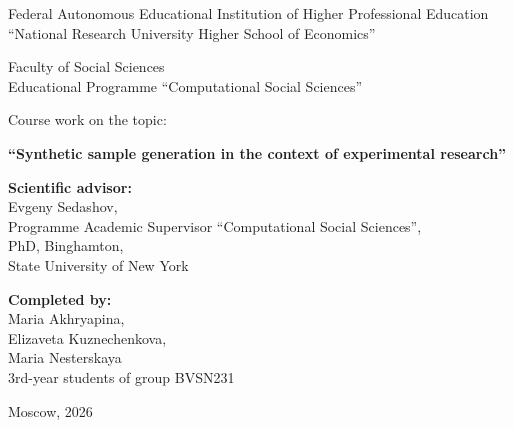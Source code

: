 \documentclass[14pt,a4paper]{extarticle}
\begin{document}
\begin{titlepage}
\begin{center}

{\normalsize
Federal Autonomous Educational Institution of Higher Professional Education\\
``National Research University Higher School of Economics''
}

\vspace{1.2cm}

{\normalsize
Faculty of Social Sciences\\
Educational Programme ``Computational Social Sciences''
}

\vspace{2.4cm}

{\normalsize
Course work on the topic:
}

\vspace{0.6cm}

{\large\bfseries
``Synthetic sample generation in the context of experimental research''
}

\vspace{1cm}

\vfill

\begin{flushright}
\begin{minipage}{0.48\textwidth}
\raggedright
\textbf{Scientific advisor:}\\
Evgeny Sedashov,\\
Programme Academic Supervisor ``Computational Social Sciences'',\\
PhD, Binghamton, \\
State University of New York 
\end{minipage}
\end{flushright}

\vspace{1cm}

\begin{flushright}
\begin{minipage}{0.48\textwidth}
\raggedright
\textbf{Completed by:}\\
Maria Akhryapina,\\
Elizaveta Kuznechenkova,\\
Maria Nesterskaya\\
3rd-year students of group BVSN231
\end{minipage}
\end{flushright}

\vfill

{\normalsize
Moscow, 2026
}

\end{center}
\end{titlepage}
\end{document}
